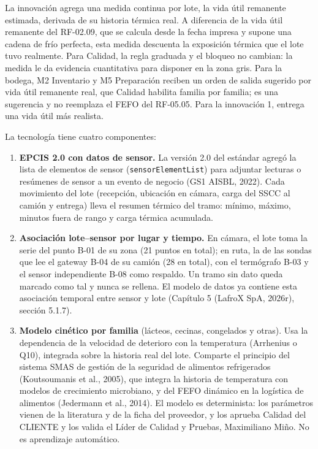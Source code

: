La innovación agrega una medida continua por lote, la vida útil remanente estimada, derivada de su historia térmica real. A diferencia de la vida útil remanente del RF-02.09, que se calcula desde la fecha impresa y supone una cadena de frío perfecta, esta medida descuenta la exposición térmica que el lote tuvo realmente. Para Calidad, la regla graduada y el bloqueo no cambian: la medida le da evidencia cuantitativa para disponer en la zona gris. Para la bodega, M2 Inventario y M5 Preparación reciben un orden de salida sugerido por vida útil remanente real, que Calidad habilita familia por familia; es una sugerencia y no reemplaza el FEFO del RF-05.05. Para la innovación 1, entrega una vida útil más realista.

La tecnología tiene cuatro componentes:

\begin{enumerate}
  \item \textbf{EPCIS 2.0 con datos de sensor.} La versión 2.0 del estándar agregó la lista de elementos de sensor (\texttt{sensorElementList}) para adjuntar lecturas o resúmenes de sensor a un evento de negocio (GS1 AISBL, 2022). Cada movimiento del lote (recepción, ubicación en cámara, carga del SSCC al camión y entrega) lleva el resumen térmico del tramo: mínimo, máximo, minutos fuera de rango y carga térmica acumulada.
  \item \textbf{Asociación lote–sensor por lugar y tiempo.} En cámara, el lote toma la serie del punto B-01 de su zona (21 puntos en total); en ruta, la de las sondas que lee el gateway B-04 de su camión (28 en total), con el termógrafo B-03 y el sensor independiente B-08 como respaldo. Un tramo sin dato queda marcado como tal y nunca se rellena. El modelo de datos ya contiene esta asociación temporal entre sensor y lote (Capítulo 5 (LafroX SpA, 2026r), sección 5.1.7).
  \item \textbf{Modelo cinético por familia} (lácteos, cecinas, congelados y otras). Usa la dependencia de la velocidad de deterioro con la temperatura (Arrhenius o Q10), integrada sobre la historia real del lote. Comparte el principio del sistema SMAS de gestión de la seguridad de alimentos refrigerados (Koutsoumanis et al., 2005), que integra la historia de temperatura con modelos de crecimiento microbiano, y del FEFO dinámico en la logística de alimentos (Jedermann et al., 2014). El modelo es determinista: los parámetros vienen de la literatura y de la ficha del proveedor, y los aprueba Calidad del CLIENTE y los valida el Líder de Calidad y Pruebas, Maximiliano Miño. No es aprendizaje automático.

\end{enumerate}
